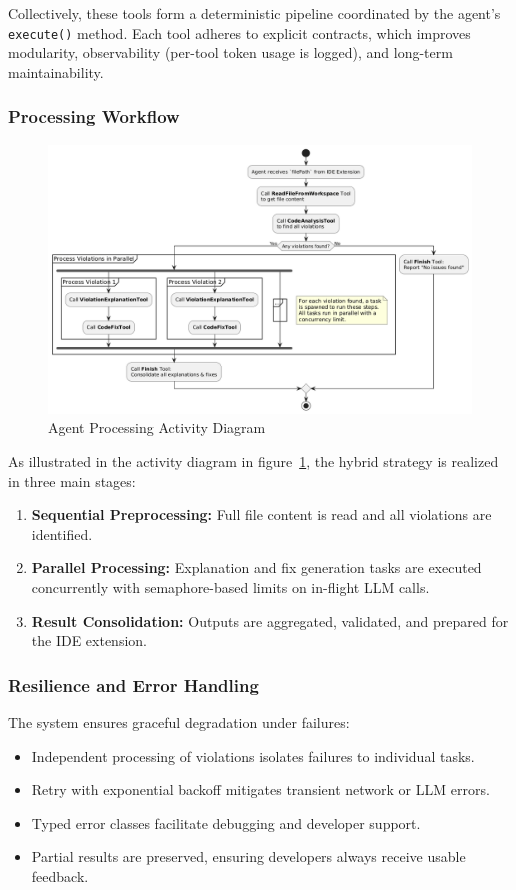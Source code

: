 \begin{spacing}{1.2}
Collectively, these tools form a deterministic pipeline coordinated by the agent’s \texttt{execute()} method. Each tool adheres to explicit contracts, which improves modularity, observability (per-tool token usage is logged), and long-term maintainability.

\subsubsection{Processing Workflow}
\begin{figure}[H]
    \centering
    \includegraphics[scale=0.5]{images/activity_diagram.png}
    \caption{Agent Processing Activity Diagram}
    \label{fig:agent_activity}
\end{figure}

As illustrated in the activity diagram in figure~\ref{fig:agent_activity}, the hybrid strategy is realized in three main stages:
\begin{enumerate}
    \item \textbf{Sequential Preprocessing:} Full file content is read and all violations are identified.
    \item \textbf{Parallel Processing:} Explanation and fix generation tasks are executed concurrently with semaphore-based 
    limits on in-flight LLM calls.
    \item \textbf{Result Consolidation:} Outputs are aggregated, validated, and prepared for the IDE extension.
\end{enumerate}


\subsubsection{Resilience and Error Handling}
The system ensures graceful degradation under failures:
\begin{itemize}
    \item Independent processing of violations isolates failures to individual tasks.
    \item Retry with exponential backoff mitigates transient network or LLM errors.
    \item Typed error classes facilitate debugging and developer support.
    \item Partial results are preserved, ensuring developers always receive usable feedback.
\end{itemize}



\end{spacing}
